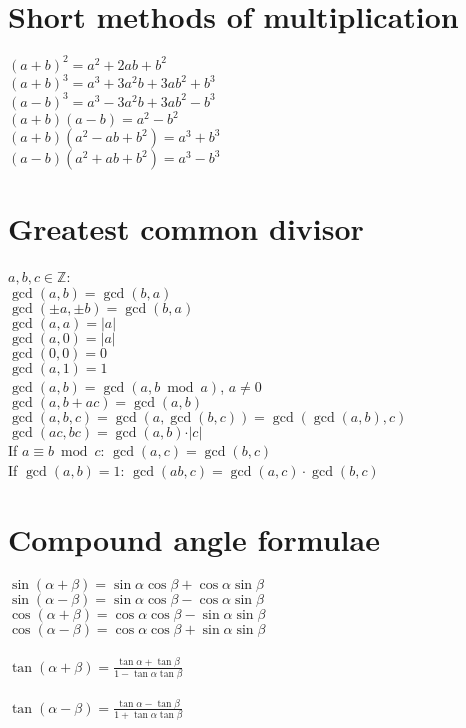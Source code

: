 \documentclass[a4paper, 10pt]{scrartcl}
\begin{document}
\section{Short methods of multiplication}
$(a + b)^{2} = a^{2} + 2ab + b^{2}$\\
$(a + b)^{3} = a^{3} + 3a^{2}b + 3ab^{2} + b^{3}$\\
$(a - b)^{3} = a^{3} - 3a^{2}b + 3ab^{2} - b^{3}$\\
$(a + b)(a - b) = a^{2} - b^{2}$\\
$(a + b)(a^{2} - ab + b^{2}) = a^{3} + b^{3}$\\
$(a - b)(a^{2} + ab + b^{2}) = a^{3} - b^{3}$\\

\section{Greatest common divisor}
$a, b, c\in \mathbb{Z}$:\\
$\gcd(a, b) = \gcd(b, a)$\\
$\gcd(\pm a, \pm b) = \gcd(b, a)$\\
$\gcd(a, a) = \vert a\vert$\\
$\gcd(a, 0) = \vert a\vert$\\
$\gcd(0, 0) = 0$\\
$\gcd(a, 1) = 1$\\
$\gcd(a, b) = \gcd(a, b\bmod a)$, $a\neq 0$\\
$\gcd(a, b + ac) = \gcd(a, b)$\\
$\gcd(a, b, c) = \gcd(a, \gcd(b, c)) = \gcd(\gcd(a, b), c)$\\
$\gcd(ac, bc) = \gcd(a, b)\cdot\vert c\vert$\\
If $a\equiv b\bmod c$: $\gcd(a, c) = \gcd(b, c)$\\
If $\gcd(a, b) = 1$: $\gcd(ab, c) = \gcd(a, c)\cdot\gcd(b, c)$\\

\section{Compound angle formulae}
$\sin{(\alpha + \beta)} = \sin{\alpha}\cos{\beta} + \cos{\alpha}\sin{\beta}$\\
$\sin{(\alpha - \beta)} = \sin{\alpha}\cos{\beta} - \cos{\alpha}\sin{\beta}$\\
$\cos{(\alpha + \beta)} = \cos{\alpha}\cos{\beta} - \sin{\alpha}\sin{\beta}$\\
$\cos{(\alpha - \beta)} = \cos{\alpha}\cos{\beta} + \sin{\alpha}\sin{\beta}$\\\\
$\tan{(\alpha + \beta)} = \frac{\tan{\alpha} + \tan{\beta}}{1 - \tan{\alpha}\tan{\beta}}$\\\\
$\tan{(\alpha - \beta)} = \frac{\tan{\alpha} - \tan{\beta}}{1 + \tan{\alpha}\tan{\beta}}$\\
\end{document}
